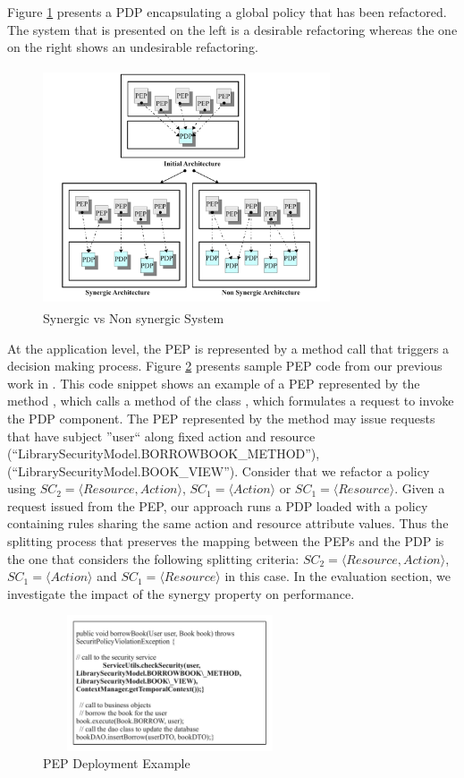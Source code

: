 Figure \ref{Synergicvsnonsynergicarchitecture} presents a PDP encapsulating a global policy that has been refactored. The system that is 
presented on the left is a desirable refactoring whereas the one on the right shows an undesirable refactoring.
\begin{figure}[!h]
\begin{center}
\includegraphics[width=8.5cm, height=7cm]{synergic-nonsynergic}
\caption{Synergic vs Non synergic System}
\label{Synergicvsnonsynergicarchitecture}
\end{center}
\end{figure}

At the application level, the PEP is represented by a method call that triggers a decision making process.
Figure \ref{PEPdeploymentexample} presents sample PEP code from our previous work in \cite{legacy}. This code snippet
 shows an example of a PEP 
represented by the method , which calls a method of the class , which formulates a request to invoke the PDP component. 
The PEP represented by the method  may issue requests that have subject ''user`` along fixed action 
and resource (``LibrarySecurityModel.BORROWBOOK\_METHOD''), (``LibrarySecurityModel.BOOK\_VIEW'').
Consider that we refactor a policy using $SC_{2}=\langle Resource,Action\rangle$, $SC_{1}=\langle Action\rangle$ or $SC_{1}=\langle Resource\rangle$.
Given a request issued from the PEP, our approach runs a PDP loaded with a policy containing rules sharing the same action and resource attribute values. 
Thus the splitting process that preserves the mapping between the PEPs and the PDP is the one that considers the following splitting criteria: 
$SC_{2}=\langle Resource,Action\rangle$, $SC_{1}=\langle Action\rangle$ and $SC_{1}=\langle Resource\rangle$ in this case.
In the evaluation section, we investigate the impact of the synergy property on performance.

\begin{figure}[!h]
\begin{center}
\includegraphics[width=7.5cm, height=4cm]{PEPExample}
\caption{PEP Deployment Example}
\label{PEPdeploymentexample}
\end{center}
\end{figure}